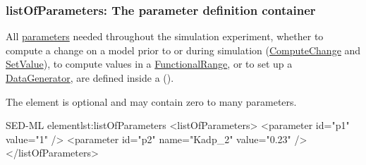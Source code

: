   \subsubsection{listOfParameters: The parameter definition container}
\label{sec:listOfParameters}
All \hyperref[class:parameter]{parameters} needed throughout the simulation experiment, whether to compute a change on a model prior to or during simulation (\hyperref[class:computeChange]{ComputeChange} and \hyperref[class:setValue]{SetValue}), to compute values in a \hyperref[class:functionalRange]{FunctionalRange}, or to set up a \hyperref[class:dataGenerator]{DataGenerator}, are defined inside a  ().
%

The element is optional and may contain zero to many parameters.
%
\begin{myXmlLst}{SED-ML  element}{lst:listOfParameters}
<listOfParameters>
 <parameter id="p1" value="1" />
 <parameter id="p2" name="Kadp_2" value="0.23" />
</listOfParameters>
\end{myXmlLst}
%


